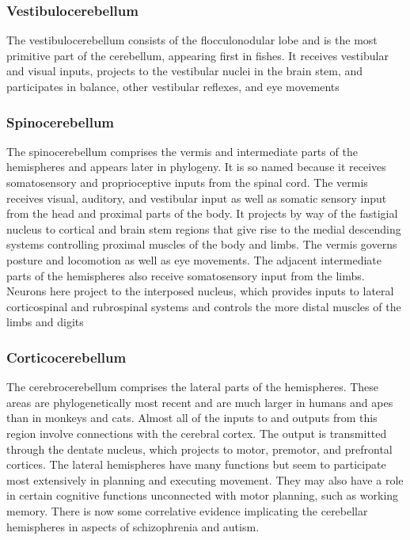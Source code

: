 \documentclass[12pt,a4paper,pdftex]{article}
\begin{document}
\subsubsection*{Vestibulocerebellum}
The vestibulocerebellum consists of the flocculonodular lobe and is the most
primitive part of the cerebellum, appearing first in fishes. It receives vestibular and visual inputs, projects to the vestibular nuclei in the brain stem, and participates in balance, other vestibular reflexes, and eye movements



\subsubsection*{Spinocerebellum}
The spinocerebellum comprises the vermis and intermediate parts of the hemispheres and appears later in phylogeny. It is so named because it receives somatosensory and proprioceptive inputs from the spinal cord. The vermis receives visual, auditory, and
vestibular input as well as somatic sensory input from the head and proximal parts of the body. It projects by way of the fastigial nucleus to cortical and brain stem
regions that give rise to the medial descending systems controlling proximal muscles of the body and limbs. The vermis governs posture and locomotion as well
as eye movements. The adjacent intermediate parts of the hemispheres also receive somatosensory input from the limbs. Neurons here project to the interposed nucleus, which provides inputs to lateral corticospinal and rubrospinal systems and controls the more distal muscles of the limbs and digits

\subsubsection*{Corticocerebellum}
The cerebrocerebellum comprises the lateral parts of the hemispheres. These areas are phylogenetically most recent and are much larger in humans and apes than in monkeys and cats. Almost all of the inputs to and outputs from this region involve connections with the cerebral cortex. The output is transmitted through the dentate nucleus, which projects to motor, premotor, and prefrontal cortices. The lateral hemispheres have many functions but seem to participate most extensively in planning and executing movement. They may also have a role in certain cognitive functions unconnected with motor planning, such as working memory. There is now some correlative evidence implicating the cerebellar hemispheres in aspects of schizophrenia and autism.
\end{document}
